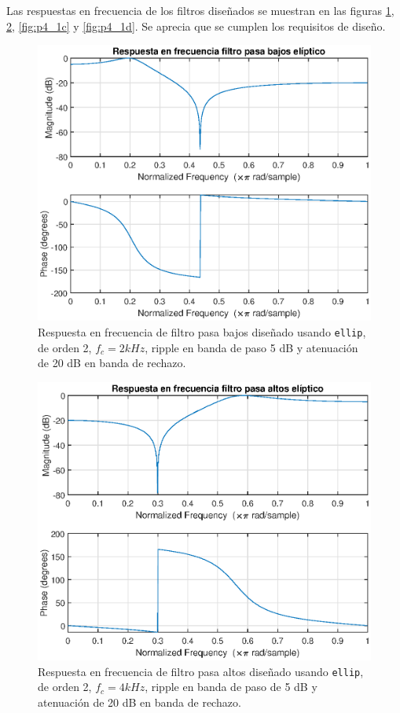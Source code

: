 \begin{enumerate}
Las respuestas en frecuencia de los filtros diseñados se muestran en las figuras \ref{fig:p4_1a}, \ref{fig:p4_1b}, \ref{fig:p4_1c} y \ref{fig:p4_1d}. Se aprecia que se cumplen los requisitos de diseño.
\begin{figure}[H]
    \centering
    \includegraphics[width = .8\linewidth]{Figuras/p4_1a.eps}
    \caption{Respuesta en frecuencia de filtro pasa bajos diseñado usando \texttt{ellip}, de orden 2, $f_c = 2 kHz$, ripple en banda de paso 5 dB y atenuación de 20 dB en banda de rechazo.}
    \label{fig:p4_1a}
\end{figure}

\begin{figure}[H]
    \centering
    \includegraphics[width = .8\linewidth]{Figuras/p4_1b.eps}
    \caption{Respuesta en frecuencia de filtro pasa altos diseñado usando \texttt{ellip}, de orden 2, $f_c = 4 kHz$, ripple en banda de paso de 5 dB y atenuación de 20 dB en banda de rechazo.}
    \label{fig:p4_1b}
\end{figure}


\end{enumerate}
